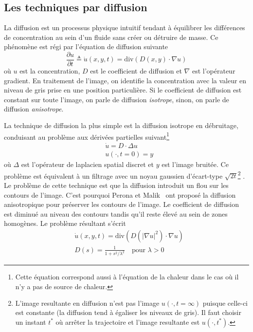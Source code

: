 \subsection{Les techniques par diffusion}

La diffusion est un processus physique intuitif tendant à équilibrer les différences de concentration au sein d'un fluide sans créer ou détruire de masse. Ce phénomène est régi par l'équation de diffusion suivante
\begin{equation}
    \frac{\partial u}{\partial t} \triangleq \dot{u}(x, y, t) = \mathrm{div} (D(x, y)\cdot \nabla u)
\end{equation}
où $u$ est la concentration, $D$ est le coefficient de diffusion et $\nabla$ est l'opérateur gradient. En traitement de l'image, on identifie la concentration avec la valeur en niveau de gris prise en une position particulière. Si le coefficient de diffusion est constant sur toute l'image, on parle de diffusion \emph{isotrope}, sinon, on parle de diffusion \emph{anisotrope}.

La technique de diffusion la plus simple est la diffusion isotrope en débruitage, conduisant au problème aux dérivées partielles suivant\footnote{Cette équation correspond aussi à l'équation de la chaleur dans le cas où il n'y a pas de source de chaleur.}
\begin{align}
&\dot{u} = D \cdot \Delta u\\
&u(\cdot, t=0) = y
\end{align}
où $\Delta$ est l'opérateur de laplacien spatial discret et $y$ est l'image bruitée. Ce problème est équivalent à un filtrage avec un noyau gaussien d'écart-type $\sqrt{2t}$\footnote{L'image resultante en diffusion n'est pas l'image $u(\cdot, t=\infty)$ puisque celle-ci est constante (la diffusion tend à égaliser les niveaux de gris). Il faut choisir un instant $t^*$ où arrêter la trajectoire et l'image resultante est $u(\cdot, t^*)$.} \cite{weickert1998anisotropic}. Le problème de cette technique est que la diffusion introduit un flou sur les contours de l'image. C'est pourquoi Perona et Malik~\cite{perona1990scale} ont proposé la diffusion anisotropique pour préserver les contours de l'image. Le coefficient de diffusion est diminué au niveau des contours tandis qu'il reste élevé au sein de zones homogènes. Le problème résultant s'écrit
\begin{align}
    &\dot{u}(x, y, t) = \mathrm{div} (D(|\nabla u|^2)\cdot \nabla u)\\
    & D(s) = \frac{1}{1+s^2/\lambda^2} \quad \text{pour $\lambda > 0$}
\end{align}

